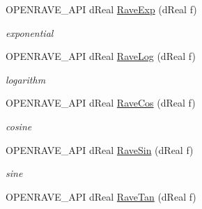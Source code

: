 \begin{Indent}{\bf }\par
{\em \label{_amgrpd41d8cd98f00b204e9800998ecf8427e}
 }\begin{DoxyCompactItemize}
\item 
OPENRAVE\_\-API dReal \hyperlink{group__affine__math_gac8e9a4de3eada3445281cf83f63a71ad}{RaveExp} (dReal f)
\begin{DoxyCompactList}\small\item\em exponential \item\end{DoxyCompactList}\item 
\hypertarget{group__affine__math_ga2358b3045fbf4f2dd3d6047c266ddb97}{
OPENRAVE\_\-API dReal \hyperlink{group__affine__math_ga2358b3045fbf4f2dd3d6047c266ddb97}{RaveLog} (dReal f)}
\label{group__affine__math_ga2358b3045fbf4f2dd3d6047c266ddb97}

\begin{DoxyCompactList}\small\item\em logarithm \item\end{DoxyCompactList}\item 
\hypertarget{group__affine__math_gafbca1a5656b1543abb89d45cf8ac4ca3}{
OPENRAVE\_\-API dReal \hyperlink{group__affine__math_gafbca1a5656b1543abb89d45cf8ac4ca3}{RaveCos} (dReal f)}
\label{group__affine__math_gafbca1a5656b1543abb89d45cf8ac4ca3}

\begin{DoxyCompactList}\small\item\em cosine \item\end{DoxyCompactList}\item 
\hypertarget{group__affine__math_ga7941e0b1a64c2dd182c2ac751d08eb1e}{
OPENRAVE\_\-API dReal \hyperlink{group__affine__math_ga7941e0b1a64c2dd182c2ac751d08eb1e}{RaveSin} (dReal f)}
\label{group__affine__math_ga7941e0b1a64c2dd182c2ac751d08eb1e}

\begin{DoxyCompactList}\small\item\em sine \item\end{DoxyCompactList}\item 
\hypertarget{group__affine__math_gae39adb12086da21a4e0fe39c96aff1d6}{
OPENRAVE\_\-API dReal \hyperlink{group__affine__math_gae39adb12086da21a4e0fe39c96aff1d6}{RaveTan} (dReal f)}
\label{group__affine__math_gae39adb12086da21a4e0fe39c96aff1d6}


\end{DoxyCompactItemize}
\end{Indent}
